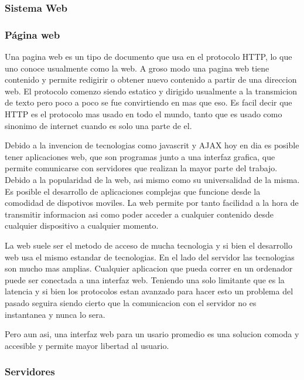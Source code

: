 \subsubsection{Sistema Web}


\subsubsection*{Página web}

Una pagina web es un tipo de documento que usa en el protocolo HTTP, lo que uno
conoce usualmente como la web. A groso modo una pagina web tiene contenido y
permite redigirir o obtener nuevo contenido a partir de una direccion web. El
protocolo comenzo siendo estatico y dirigido usualmente a la transmicion de
texto pero poco a poco se fue convirtiendo en mas que eso. Es facil decir que
HTTP es el protocolo mas usado en todo el mundo, tanto que es usado como
sinonimo de internet cuando es solo una parte de el.

Debido a la invencion de tecnologias como javascrit y AJAX hoy en dia es
posible tener aplicaciones web, que son programas junto a una interfaz grafica,
que permite comunicarse con servidores que realizan la mayor parte del trabajo.
Debido a la popularidad de la web, asi mismo como su universalidad de la
misma. Es posible el desarrollo de aplicaciones complejas que funcione desde la
comodidad de dispotivos moviles. La web permite por tanto facilidad a la hora
de transmitir informacion asi como poder acceder a cualquier contenido desde
cualquier dispositivo a cualquier momento.

La web suele ser el metodo de acceso de mucha tecnologia y si bien el
desarrollo web usa el mismo estandar de tecnologias. En el lado del servidor
las tecnologias son mucho mas amplias. Cualquier aplicacion que pueda correr
en un ordenador puede ser conectada a una interfaz web. Teniendo una solo
limitante que es la latencia y si bien los protocolos estan avanzado para hacer
esto un problema del pasado seguira siendo cierto que la comunicacion con el
servidor no es instantanea y nunca lo sera.

Pero aun asi, una interfaz web para un usario promedio es una solucion comoda y
accesible y permite mayor libertad al usuario.



\subsubsection*{Servidores}

